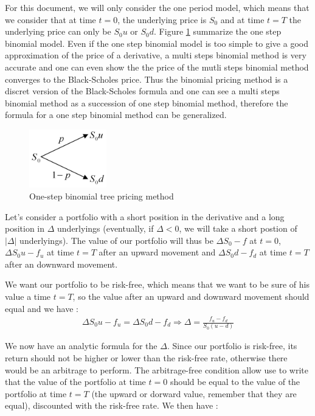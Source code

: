 \documentclass[hidelinks]{article}
\newenvironment{nalign}{
    \begin{equation}
    \begin{aligned}
}{
    \end{aligned}
    \end{equation}
    \ignorespacesafterend
}
\begin{document}
	For this document, we will only consider the one period model, which means that we consider that at time $t=0$, the underlying price is $S_0$ and at time $t=T$ the underlying price can only be $S_0u$ or $S_0d$. Figure \ref{fig:binom} summarize the one step binomial model. Even if the one step binomial model is too simple to give a good approximation of the price of a derivative, a multi steps binomial method is very accurate and one can even show the the price of the mutli steps binomial method converges to the Black-Scholes price. Thus the binomial pricing method is a discret version of the Black-Scholes formula and one can see a multi steps binomial method as a succession of one step binomial method, therefore the formula for a one step binomial method can be generalized.
	
\begin{figure}[!h]
	\centering
	\includegraphics[width=0.3\textwidth]{binomial.jpg}
    \caption{One-step binomial tree pricing method}
    \label{fig:binom}
    \end{figure}

	
	Let's consider a portfolio with a short position in the derivative and a long position in $\Delta$ underlyings (eventually, if $\Delta<0$, we will take a short postion of $|\Delta|$ underlyings). The value of our portfolio will thus be $\Delta S_0 - f$ at $t=0$, $\Delta S_0 u - f_u$ at time $t=T$ after an upward movement and $\Delta S_0 d - f_d$ at time $t=T$ after an downward movement.
	
	We want our portfolio to be risk-free, which means that we want to be sure of his value a time $t=T$, so the value after an upward and downward movement should equal and we have :
	\begin{nalign}
	\Delta S_0 u - f_u = \Delta S_0 d - f_d \Rightarrow \Delta = \frac{f_u - f_d}{S_0 (u-d)}
	\end{nalign}
	
	We now have an analytic formula for the $\Delta$. Since our portfolio is risk-free, its return should not be higher or lower than the risk-free rate, otherwise there would be an arbitrage to perform. The arbitrage-free condition allow use to write that the value of the portfolio at time $t=0$ should be equal to the value of the portfolio at time $t=T$ (the upward or dorward value, remember that they are equal), discounted with the risk-free rate. We then have :
	
\end{document}
